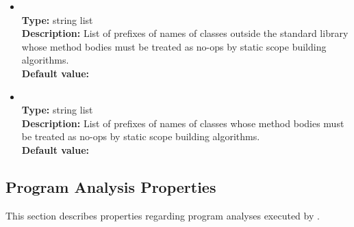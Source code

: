 \begin{itemize}
\item
{} \\
{\bf Type:} string list \\
{\bf Description:} List of prefixes of names of classes outside the standard library whose method bodies must be treated as no-ops by static scope building algorithms. \\
{\bf Default value:} 

\item
{} \\
{\bf Type:} string list \\
{\bf Description:} List of prefixes of names of classes whose method bodies must be treated as no-ops by static scope building algorithms. \\
{\bf Default value:} 
\end{itemize}

\subsection{Program Analysis Properties}

This section describes properties regarding program analyses executed by \Chord.

